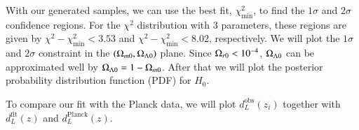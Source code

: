 With our generated samples, we can use the best fit, $\chi^2_\mathrm{min}$, to find the $1\sigma$ and $2\sigma$ confidence regions. For the $\chi^2$ distribution with $3$ parameters, these regions are given by $\chi^2 - \chi^2_\mathrm{min}<3.53$ and $\chi^2 - \chi^2_\mathrm{min}<8.02$, respectively. We will plot the $1\sigma$ and $2\sigma$ constraint in the $(\Omega_{m0},\Omega_{\Lambda 0})$ plane. Since $\Omega_{r0}<10^{-4}$, $\Omega_{\Lambda 0}$ can be approximated well by $\Omega_{\Lambda 0}=1-\Omega_{m0}$. After that we will plot the posterior probability distribution function (PDF) for $H_0$. 

To compare our fit with the Planck data, we will plot $d_L^\mathrm{obs}(z_i)$ together with $d_L^\mathrm{fit}(z)$ and $d_L^\mathrm{Planck}(z)$. 



